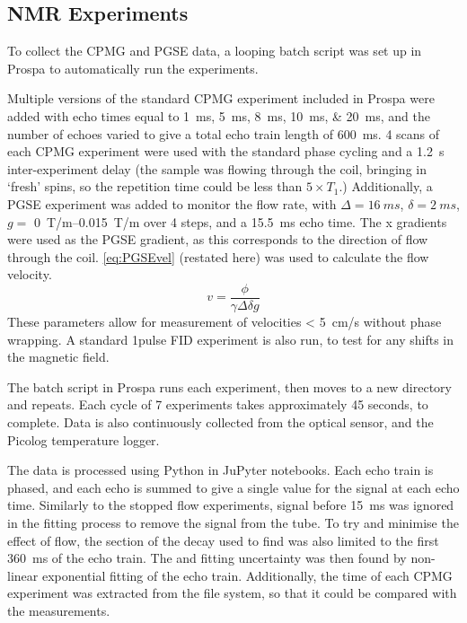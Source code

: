 \subsection{NMR Experiments}
To collect the CPMG and PGSE data, a looping batch script was set up in Prospa to automatically run the experiments.

Multiple versions of the standard CPMG experiment included in Prospa were added with echo times equal to \SIlist{1;5;8;10;20}{ms}, and the number of echoes varied to give a total echo train length of \SI{600}{ms}.
4 scans of each CPMG experiment were used with the standard phase cycling and a \SI{1.2}{s} inter-experiment delay (the sample was flowing through the coil, bringing in `fresh' spins, so the repetition time could be less than $5 \times \mathit{T_1}$.)
Additionally, a PGSE experiment was added to monitor the flow rate, with $\Delta = \SI{16}{ms}$, $\delta = \SI{2}{ms}$, $\mathit{g} =$ \SIrange{0}{0.015}{T/m} over 4 steps, and a \SI{15.5}{ms} echo time.
The x gradients were used as the PGSE gradient, as this corresponds to the direction of flow through the coil.
\autoref{eq:PGSEvel} (restated here) was used to calculate the flow velocity.
\begin{displaymath}
v = \frac{\phi}{\gamma \Delta \delta g}
\end{displaymath}
These parameters allow for measurement of velocities \SI{< 5}{cm/s} without phase wrapping.
A standard 1pulse FID experiment is also run, to test for any shifts in the magnetic field.

The batch script in Prospa runs each experiment, then moves to a new directory and repeats.
Each cycle of 7 experiments takes approximately 45 seconds, to complete.
Data is also continuously collected from the optical \SOtwo sensor, and the Picolog temperature logger.

The data is processed using Python in JuPyter notebooks.
Each echo train is phased, and each echo is summed to give a single value for the signal at each echo time.
Similarly to the stopped flow experiments, signal before \SI{15}{ms} was ignored in the fitting process to remove the signal from the tube.
To try and minimise the effect of flow, the section of the decay used to find \Ttwo was also limited to the first \SI{360}{ms} of the echo train.
The \Ttwo and fitting uncertainty was then found by non-linear exponential fitting of the echo train.
Additionally, the time of each CPMG experiment was extracted from the file system, so that it could be compared with the \SOtwo measurements.


